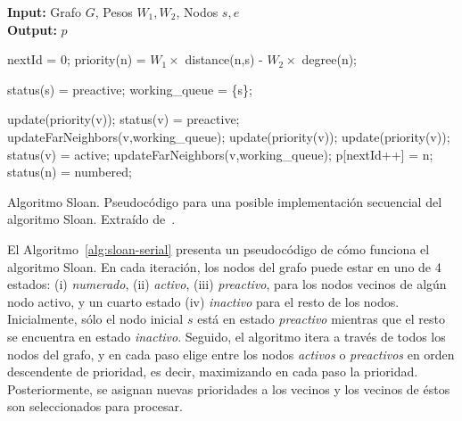 \begin{algorithm}[]
\textbf{Input:} Grafo $G$, Pesos $W_1, W_2$, Nodos $s,e$ \\
\textbf{Output:} $p$
\begin{algorithmic}
\STATE nextId = 0;
\STATE priority(n) = $W_1 \times$ distance(n,s) - $W_2 \times$ degree(n);
\ENDFOR

\STATE status(s) = preactive;
\STATE working\_queue = \{s\};

    \STATE update(priority(v));
    \STATE status(v) = preactive;
    \STATE updateFarNeighbors(v,working\_queue);
    \STATE update(priority(v));
    \STATE update(priority(v));
    \STATE status(v) = active;
    \STATE updateFarNeighbors(v,working\_queue);
\ENDIF
\STATE p[nextId++] = n;
\STATE status(n) = numbered;
\ENDFOR
\ENDFOR

\ENDFOR
\ENDFOR
\end{algorithmic}
\caption{
Algoritmo Sloan. Pseudocódigo para una posible implementación secuencial del algoritmo Sloan. Extraído de~\cite{sloan-parallel}.
}
\label{alg:sloan-serial}
\end{algorithm}

El Algoritmo~\ref{alg:sloan-serial} presenta un pseudocódigo de cómo funciona el algoritmo Sloan. En cada iteración, los  nodos del grafo puede estar en uno de 4 estados: (i) \textit{numerado}, (ii) \textit{activo}, (iii) \textit{preactivo}, para los nodos vecinos de algún nodo activo, y un cuarto estado (iv) \textit{inactivo} para el resto de los nodos. Inicialmente, sólo el nodo inicial $s$ está en estado \textit{preactivo} mientras que el resto se encuentra en estado \textit{inactivo}. Seguido, el algoritmo itera a través de todos los nodos del grafo, y en cada paso elige entre los nodos \textit{activos} o \textit{preactivos} en orden descendente de prioridad, es decir, maximizando en cada paso la prioridad. Posteriormente, se asignan nuevas prioridades a los vecinos y los vecinos de éstos son seleccionados para procesar.

